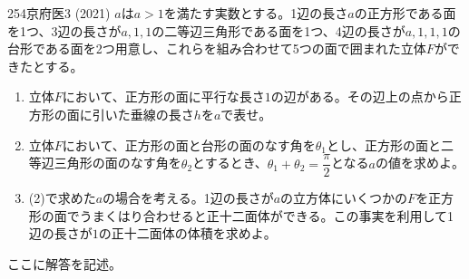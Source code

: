 \begin{prob}{254}{}{京府医3 (2021)}
 $a$は$a>1$を満たす実数とする。1辺の長さ$a$の正方形である面を1つ、3辺の長さが$a,1,1$の二等辺三角形である面を1つ、4辺の長さが$a,1,1,1$の台形である面を2つ用意し、これらを組み合わせて5つの面で囲まれた立体$F$ができたとする。
 \begin{enumerate}
  \item 立体$F$において、正方形の面に平行な長さ$1$の辺がある。その辺上の点から正方形の面に引いた垂線の長さ$h$を$a$で表せ。
  \item 立体$F$において、正方形の面と台形の面のなす角を$\theta_1$とし、正方形の面と二等辺三角形の面のなす角を$\theta_2$とするとき、$\theta_1+\theta_2=\dfrac{\pi}{2}$となる$a$の値を求めよ。
  \item (2)で求めた$a$の場合を考える。1辺の長さが$a$の立方体にいくつかの$F$を正方形の面でうまくはり合わせると正十二面体ができる。この事実を利用して1辺の長さが$1$の正十二面体の体積を求めよ。
 \end{enumerate}
\end{prob}
ここに解答を記述。